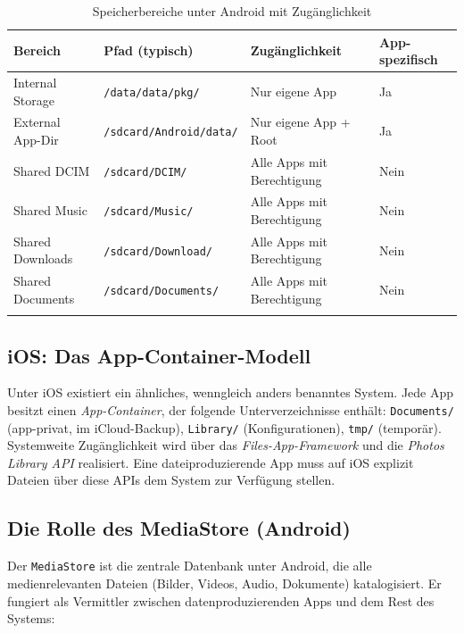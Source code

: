 ﻿\documentclass[12pt, a4paper]{article}
\begin{document}
\begin{longtable}{@{}p{3.5cm} p{3.5cm} p{4.5cm} p{2cm}@{}}
\toprule
\textbf{Bereich} & \textbf{Pfad (typisch)} & \textbf{Zugänglichkeit} & \textbf{App-spezifisch} \\
\midrule
\endhead
Internal Storage & \texttt{/data/data/pkg/} & Nur eigene App & Ja \\
External App-Dir & \texttt{/sdcard/Android/data/} & Nur eigene App + Root & Ja \\
Shared DCIM & \texttt{/sdcard/DCIM/} & Alle Apps mit Berechtigung & Nein \\
Shared Music & \texttt{/sdcard/Music/} & Alle Apps mit Berechtigung & Nein \\
Shared Downloads & \texttt{/sdcard/Download/} & Alle Apps mit Berechtigung & Nein \\
Shared Documents & \texttt{/sdcard/Documents/} & Alle Apps mit Berechtigung & Nein \\
\bottomrule
\caption{Speicherbereiche unter Android mit Zugänglichkeit}
\label{tab:android-speicher}
\end{longtable}

\subsection{iOS: Das App-Container-Modell}

Unter iOS existiert ein ähnliches, wenngleich anders benanntes System. Jede App besitzt
einen \emph{App-Container}, der folgende Unterverzeichnisse enthält: \texttt{Documents/}
(app-privat, im iCloud-Backup), \texttt{Library/} (Konfigurationen), \texttt{tmp/}
(temporär). Systemweite Zugänglichkeit wird über das \emph{Files-App-Framework} und
die \emph{Photos Library API} realisiert. Eine dateiproduzierende App muss auf iOS
explizit Dateien über diese APIs dem System zur Verfügung stellen.

\subsection{Die Rolle des MediaStore (Android)}

Der \texttt{MediaStore} ist die zentrale Datenbank unter Android, die alle medienrelevanten
Dateien (Bilder, Videos, Audio, Dokumente) katalogisiert. Er fungiert als Vermittler
zwischen datenproduzierenden Apps und dem Rest des Systems:
\end{document}
